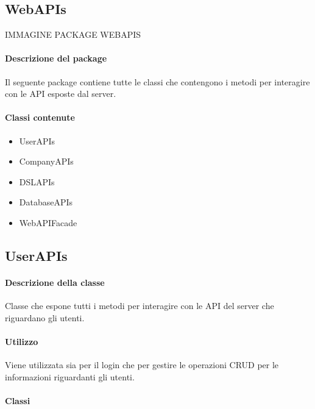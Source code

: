 \subsection{WebAPIs}

IMMAGINE PACKAGE WEBAPIS

\paragraph*{Descrizione del package}
Il seguente package contiene tutte le classi che contengono i metodi per interagire con le API esposte dal server. 
\paragraph*{Classi contenute}
\begin{itemize}
\item UserAPIs
\item CompanyAPIs
\item DSLAPIs
\item DatabaseAPIs
\item WebAPIFacade
\end{itemize}

\subsection{UserAPIs}
\paragraph*{Descrizione della classe}
Classe che espone tutti i metodi per interagire con le API del server che riguardano gli utenti.

\paragraph*{Utilizzo}
Viene utilizzata sia per il login che per gestire le operazioni CRUD per le informazioni riguardanti gli utenti.

\paragraph*{Classi }
